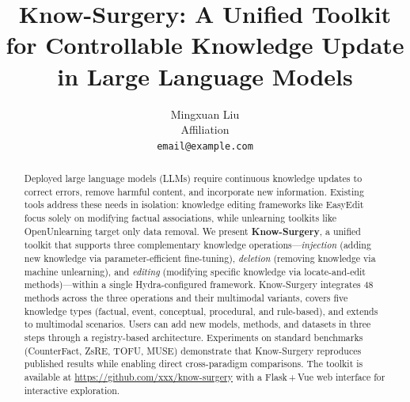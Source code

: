 \documentclass[11pt]{article}
\title{Know-Surgery: A Unified Toolkit for Controllable Knowledge Update in Large Language Models}
\author{
  Mingxuan Liu \\
  Affiliation \\
  \texttt{email@example.com}
}
\begin{document}
\maketitle

\begin{abstract}
Deployed large language models (LLMs) require continuous knowledge updates to correct errors, remove harmful content, and incorporate new information.
Existing tools address these needs in isolation: knowledge editing frameworks like EasyEdit focus solely on modifying factual associations, while unlearning toolkits like OpenUnlearning target only data removal.
We present \textbf{Know-Surgery}, a unified toolkit that supports three complementary knowledge operations---\textit{injection} (adding new knowledge via parameter-efficient fine-tuning), \textit{deletion} (removing knowledge via machine unlearning), and \textit{editing} (modifying specific knowledge via locate-and-edit methods)---within a single Hydra-configured framework.
Know-Surgery integrates 48 methods across the three operations and their multimodal variants, covers five knowledge types (factual, event, conceptual, procedural, and rule-based), and extends to multimodal scenarios.
Users can add new models, methods, and datasets in three steps through a registry-based architecture.
Experiments on standard benchmarks (CounterFact, ZsRE, TOFU, MUSE) demonstrate that Know-Surgery reproduces published results while enabling direct cross-paradigm comparisons.
The toolkit is available at \url{https://github.com/xxx/know-surgery} with a Flask\,+\,Vue web interface for interactive exploration.
\end{abstract}










\appendix

\end{document}
